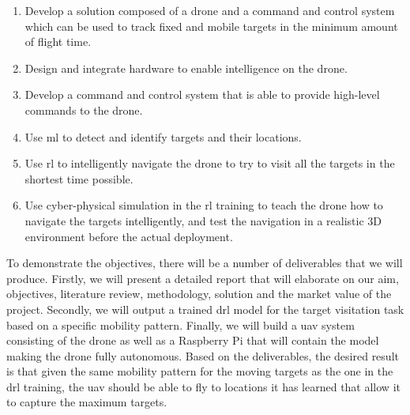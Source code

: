 \documentclass[../main.tex]{subfiles}
\begin{document}
\begin{enumerate}
    \item \label{obj:overview}
        Develop a solution composed of a drone and
        a command and control system which can be used
        to track fixed and mobile targets in the
        minimum amount of flight time.
    \item \label{obj:hardware} Design and integrate 
        hardware to enable 
        intelligence on the drone.
    \item Develop a command and control system that
        is able to provide high-level commands 
        to the drone.
    \item \label{obj:machine-learning} 
        Use \gls{ml} to detect and identify
        targets and their locations.
    \item \label{obj:drl} Use \gls{rl}
        to intelligently
        navigate the drone to try to visit all the targets
        in the shortest time possible.
    \item \label{obj:simulation} 
        Use cyber-physical simulation in the \gls{rl} training
        to teach the drone how to navigate the targets
        intelligently, and test the navigation in a realistic
        3D environment before the actual deployment.
\end{enumerate}

To demonstrate the objectives, there will be a number 
of deliverables that we will produce.
Firstly, we will present a detailed report 
that will elaborate on our aim, objectives, 
literature review, methodology,
solution and the market value of the project.
Secondly, we will output a trained \gls{drl} model for 
the target visitation task based on a specific
mobility pattern.
Finally, we will build a \gls{uav} system
consisting of the \anafi drone as well as a Raspberry Pi
that will contain the model making the
\anafi drone fully autonomous.
Based on the deliverables, the desired result is that
given the same mobility pattern for 
the moving targets as the one in the \gls{drl} training,
the \gls{uav} should be able to fly to locations it has learned
that allow it to capture the maximum targets. 
\end{document}
